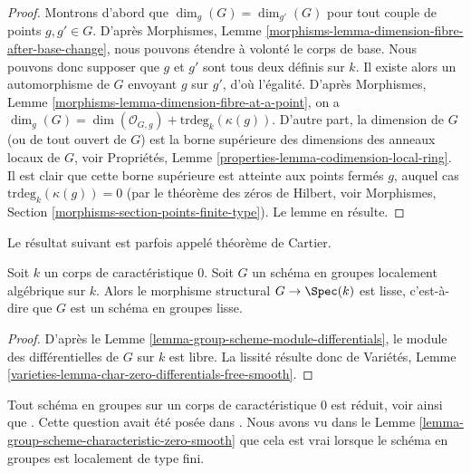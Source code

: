\begin{proof}
Montrons d'abord que $\dim_g(G) = \dim_{g'}(G)$ pour tout
couple de points $g, g' \in G$. D'après
Morphismes, Lemme \ref{morphisms-lemma-dimension-fibre-after-base-change},
nous pouvons étendre à volonté le corps de base. Nous pouvons donc supposer que
$g$ et $g'$ sont tous deux définis sur $k$. Il existe alors un
automorphisme de $G$ envoyant $g$ sur $g'$, d'où l'égalité.
D'après
Morphismes, Lemme \ref{morphisms-lemma-dimension-fibre-at-a-point},
on a
$\dim_g(G) = \dim(\mathcal{O}_{G, g}) +
\text{trdeg}_k(\kappa(g))$.
D'autre part, la dimension de $G$ (ou de tout ouvert de $G$)
est la borne supérieure des dimensions des anneaux locaux de $G$, voir
Propriétés, Lemme \ref{properties-lemma-codimension-local-ring}.
Il est clair que cette borne supérieure est atteinte aux points fermés $g$, auquel cas
$\text{trdeg}_k(\kappa(g)) = 0$ (par le théorème des zéros de Hilbert, voir
Morphismes, Section \ref{morphisms-section-points-finite-type}).
Le lemme en résulte.
\end{proof}

\noindent
Le résultat suivant est parfois appelé théorème de Cartier.

\begin{lemma}
\label{lemma-group-scheme-characteristic-zero-smooth}
Soit $k$ un corps de caractéristique $0$. Soit $G$ un
schéma en groupes localement algébrique sur $k$. Alors le morphisme
structural $G \to \Spec(k)$ est lisse, c'est-à-dire que $G$ est un
schéma en groupes lisse.
\end{lemma}

\begin{proof}
D'après le
Lemme \ref{lemma-group-scheme-module-differentials},
le module des différentielles de $G$ sur $k$ est libre.
La lissité résulte donc de
Variétés, Lemme \ref{varieties-lemma-char-zero-differentials-free-smooth}.
\end{proof}

\begin{remark}
\label{remark-when-reduced}
Tout schéma en groupes sur un corps de caractéristique $0$ est réduit, voir
\cite[I, Theorem 1.1 and I, Corollary 3.9, and II, Theorem 2.4]{Perrin-thesis}
ainsi que
\cite[Proposition 4.2.8]{Perrin}.
Cette question avait été posée dans
\cite[page 80]{Oort}.
Nous avons vu dans le
Lemme \ref{lemma-group-scheme-characteristic-zero-smooth}
que cela est vrai lorsque le schéma en groupes est localement de type fini.
\end{remark}

